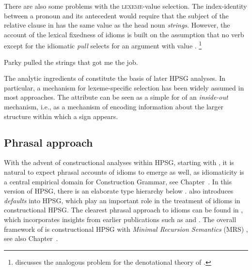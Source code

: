 \documentclass[output=paper]{langsci/langscibook}
\begin{document}
There are also some problems with the \textsc{lexeme}-value selection. The index-identity between a pronoun and its antecedent would require that the subject of the relative clause in  has the same  value as the head noun \emph{strings}. However, the account of the lexical fixedness of idioms is built on the assumption that no verb except for the idiomatic \emph{pull} selects for an argument with  value .%
\footnote{\cite{Pulman:93} discusses the analogous problem for the denotational theory of \cite{GKPS85a}.}

\ea \label{strings-relcl}
Parky pulled the strings that got me the job.
\citep[137]{McCawley:81}
\z 

The analytic ingredients of \cite{KE94a} constitute the basis of later HPSG analyses. In particular, a mechanism for lexeme-specific selection has been widely assumed in most approaches. The attribute  can be seen as a simple for of an \emph{inside-out} mechanism, i.e., as a mechanism of encoding information about the larger structure within which a sign appears. 


\subsection{Phrasal approach}
\label{Sec-Phrasal}

With the advent of constructional analyses within HPSG, starting with \cite{Sag97a}, it is natural to expect phrasal accounts of idioms to emerge as well, as idiomaticity is a central empirical domain for Construction Grammar, see Chapter~. 
In this version of HPSG, there is an elaborate type hierarchy below . 
\cite{Sag97a} also introduces \emph{defaults} into HPSG, which play an important role in the treatment of idioms in constructional HPSG.
The clearest phrasal approach to idioms can be found in \cite{Riehemann2001a}, which incorporates insights from earlier publications such as \cite{Riehemann97a} and \cite{RB99a}.
%
The overall framework of \cite{Riehemann2001a} is constructional HPSG with \emph{Minimal Recursion Semantics} (MRS) \citep{CFMRS95a-u,CFPS2005a}, see also Chapter~.
\end{document}
